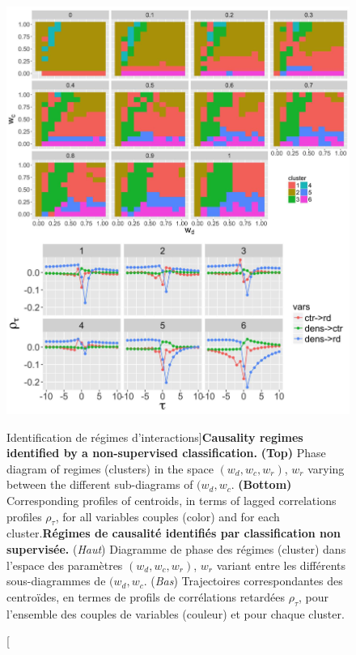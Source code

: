 \begin{figure}
\includegraphics[width=\linewidth]{Figures/Final/4-2-2-fig-causalityregimes-clustering.jpg}
\caption[Identification of interaction regimes][Identification de régimes d'interactions]{\textbf{Causality regimes identified by a non-supervised classification.} \textbf{(Top)} Phase diagram of regimes (clusters) in the space $(w_{d},w_{c},w_{r})$, $w_r$ varying between the different sub-diagrams of $(w_{d},w_{c}$. \textbf{(Bottom)} Corresponding profiles of centroids, in terms of lagged correlations profiles $\rho_{\tau}$, for all variables couples (color) and for each cluster.\label{fig:causalityregimes:clustering}}{\textbf{Régimes de causalité identifiés par classification non supervisée.} (\textit{Haut}) Diagramme de phase des régimes (cluster) dans l'espace des paramètres $(w_{d},w_{c},w_{r})$, $w_r$ variant entre les différents sous-diagrammes de $(w_{d},w_{c}$. (\textit{Bas}) Trajectoires correspondantes des centroïdes, en termes de profils de corrélations retardées $\rho_{\tau}$, pour l'ensemble des couples de variables (couleur) et pour chaque cluster.\label{fig:causalityregimes:clustering}}
\end{figure}



